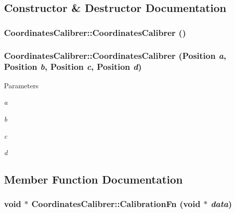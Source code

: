 \subsection{Constructor \& Destructor Documentation}
\hypertarget{classCoordinatesCalibrer_ac9a522299ada8f2e58ed8f0c91f4f396}{
\subsubsection[{CoordinatesCalibrer}]{\setlength{\rightskip}{0pt plus 5cm}CoordinatesCalibrer::CoordinatesCalibrer ()}}
\label{classCoordinatesCalibrer_ac9a522299ada8f2e58ed8f0c91f4f396}
\hypertarget{classCoordinatesCalibrer_a3b6304945fa64ac97a1b0bbc78753155}{
\subsubsection[{CoordinatesCalibrer}]{\setlength{\rightskip}{0pt plus 5cm}CoordinatesCalibrer::CoordinatesCalibrer (Position {\em a}, \/  Position {\em b}, \/  Position {\em c}, \/  Position {\em d})}}
\label{classCoordinatesCalibrer_a3b6304945fa64ac97a1b0bbc78753155}

\begin{DoxyParams}{Parameters}
\item[{\em a}]\item[{\em b}]\item[{\em c}]\item[{\em d}]\end{DoxyParams}


\subsection{Member Function Documentation}
\hypertarget{classCoordinatesCalibrer_a4ce4c153ae8c3e50faccfba40e6bc4ea}{
\subsubsection[{CalibrationFn}]{\setlength{\rightskip}{0pt plus 5cm}void $\ast$ CoordinatesCalibrer::CalibrationFn (void $\ast$ {\em data})}}
\label{classCoordinatesCalibrer_a4ce4c153ae8c3e50faccfba40e6bc4ea}

